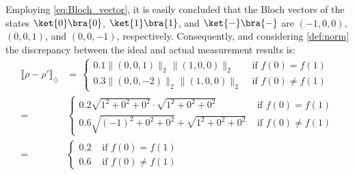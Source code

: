       Employing \autoref{eq:Bloch_vector}, it is easily concluded that the Bloch vectors of the states $\ket{0} \bra{0}$, $\ket{1} \bra{1}$, and $\ket{-} \bra{-}$ are $(-1,0,0)$, $(0,0,1)$, and $(0,0,-1)$, respectively. Consequently, and considering \autoref{def:norm}  the discrepancy between the ideal and actual measurement results is:
    \begin{equation}
      \begin{split}
        \llbracket \rho - \rho' \rrbracket_{\diamondsuit} & = \hspace{2pt}
        \begin{cases}
          0.1 \lVert (0,0,1) \rVert_{2}  \hspace{1pt} \lVert (1,0,0)\rVert_{2}  &\text{ if }   f(0)= f(1) \\
          0.3\lVert(0,0,-2)\rVert_{2} \hspace{1pt}  \lVert (1,0,0)\rVert_{2} &\text{ if }   f(0) \neq f(1)
        \end{cases} \\
        = \hspace{2pt} &
        \begin{cases}
          0.2 \sqrt{1^{2} + 0^{2} + 0^{2}} \cdot \sqrt{1^{2} + 0^{2} + 0^{2}} &\text{ if }   f(0)= f(1) \\
          0.6\sqrt{(-1)^{2} + 0^{2} + 0^{2}} + \sqrt{1^{2} + 0^{2} + 0^{2}} &\text{ if }   f(0) \neq f(1)
        \end{cases} \\
        = \hspace{2pt} &
        \begin{cases}
         0.2 &\text{ if }   f(0)= f(1) \\
          0.6  &\text{ if }   f(0) \neq f(1)
        \end{cases} \\
      \end{split}
  \end{equation}
  

